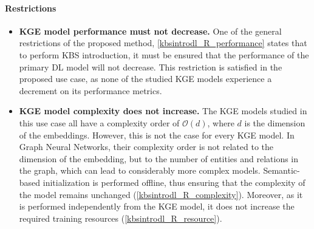 \paragraph{Restrictions}
\begin{itemize}
    \item \textbf{KGE model performance must not decrease.} One of the general restrictions of the proposed method, \ref{kbsintrodl_R_performance} states that to perform KBS introduction, it must be ensured that the performance of the primary DL model will not decrease. This restriction is satisfied in the proposed use case, as none of the studied KGE models experience a decrement on its performance metrics. 
    
    \item \textbf{KGE model complexity does not increase.} The KGE models studied in this use case all have a complexity order of $\mathcal{O}(d)$, where $d$ is the dimension of the embeddings. However, this is  not the case for every KGE model. In Graph Neural Networks, their complexity order is not related to the dimension of the embedding, but to the number of entities and relations in the graph, which can lead to considerably more complex models. Semantic-based initialization is performed offline, thus ensuring that the complexity of the model remains unchanged (\ref{kbsintrodl_R_complexity}). Moreover, as it is performed independently from the KGE model, it does not increase the required training resources (\ref{kbsintrodl_R_resource}).
\end{itemize}
